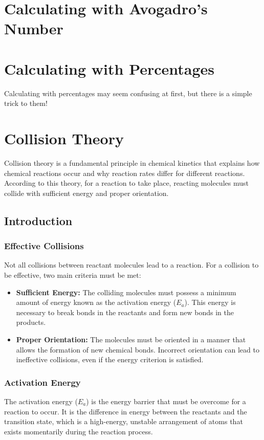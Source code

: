 \documentclass[10pt, roman]{article}
\begin{document}
\section{Calculating with Avogadro's Number}
\section{Calculating with Percentages}
Calculating with percentages may seem confusing at first, but there is a simple trick to them!
\section{Collision Theory}
Collision theory is a fundamental principle in chemical kinetics that explains how chemical reactions occur and why reaction rates differ for different reactions. According to this theory, for a reaction to take place, reacting molecules must collide with sufficient energy and proper orientation.
\subsection{Introduction}

\subsubsection{Effective Collisions}

Not all collisions between reactant molecules lead to a reaction. For a collision to be effective, two main criteria must be met:
\begin{itemize}
    \item \textbf{Sufficient Energy:} The colliding molecules must possess a minimum amount of energy known as the activation energy (\(E_a\)). This energy is necessary to break bonds in the reactants and form new bonds in the products.
    \item \textbf{Proper Orientation:} The molecules must be oriented in a manner that allows the formation of new chemical bonds. Incorrect orientation can lead to ineffective collisions, even if the energy criterion is satisfied.
\end{itemize}

\subsubsection{Activation Energy}

The activation energy (\(E_a\)) is the energy barrier that must be overcome for a reaction to occur. It is the difference in energy between the reactants and the transition state, which is a high-energy, unstable arrangement of atoms that exists momentarily during the reaction process.
\end{document}
